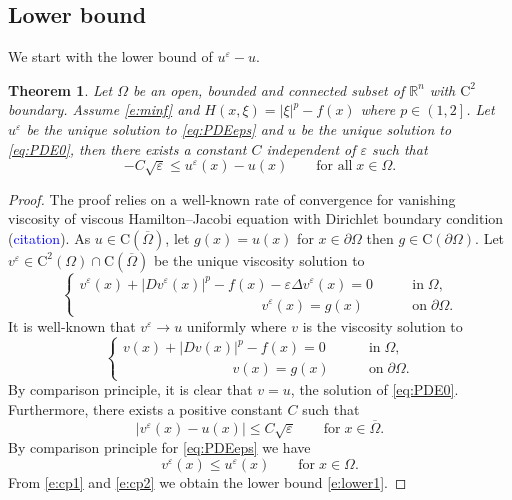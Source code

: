 \documentclass[11pt,reqno]{amsart}
\numberwithin{figure}{section}
\theoremstyle{plain}
\newtheorem{thm}{Theorem}[section]
\theoremstyle{remark}
\numberwithin{equation}{section}
\newcommand{\R}{\mathbb{R}}
\begin{document}
\subsection{Lower bound}
We start with the lower bound of $u^\varepsilon - u$.
\begin{thm} Let $\Omega$ be an open, bounded and connected subset of $\R^n$ with $\mathrm{C}^2$ boundary. Assume \eqref{e:minf} and $H(x,\xi) = |\xi|^p - f(x)$ where $p\in\left(1,2\right]$. Let $u^\varepsilon$ be the unique solution to \eqref{eq:PDEeps} and $u$ be the unique solution to \eqref{eq:PDE0}, then there exists a constant $C$ independent of $\varepsilon$ such that
\begin{equation}\label{e:lower1}
    -C\sqrt{\varepsilon} \leq u^\varepsilon(x) - u(x) \qquad\text{for all}\;x\in \Omega.
\end{equation} 
\end{thm}
\begin{proof} The proof relies on a well-known rate of convergence for vanishing viscosity of viscous Hamilton--Jacobi equation with Dirichlet boundary condition (\textcolor{blue}{citation}). As $u\in \mathrm{C}(\overline{\Omega})$, let $g(x) = u(x)$ for $x\in \partial\Omega$ then $g\in \mathrm{C}(\partial\Omega)$. Let $v^\varepsilon\in \mathrm{C}^2(\Omega)\cap \mathrm{C}(\overline{\Omega})$ be the unique viscosity solution to
\begin{equation*}
    \begin{cases}
          v^\varepsilon(x) + |Dv^\varepsilon(x)|^p - f(x) - \varepsilon \Delta v^\varepsilon(x) = 0 &\qquad\text{in}\;\Omega,\\
        \qquad\qquad\qquad\qquad\qquad \qquad\quad v^\varepsilon(x) = g(x) &\qquad\text{on}\;\partial\Omega.
    \end{cases}
\end{equation*}
It is well-known that $v^\varepsilon \to u$ uniformly where $v$ is the viscosity solution to
\begin{equation*}
\begin{cases}
       v(x) + |Dv(x)|^p - f(x) = 0 &\qquad\text{in}\;\Omega,\\
     \qquad\qquad\qquad\quad\;\;\; v(x) = g(x)&\qquad\text{on}\;\partial\Omega. 
\end{cases}
\end{equation*}
By comparison principle, it is clear that $v = u$, the solution of \eqref{eq:PDE0}. Furthermore, there exists a positive constant $C$ such that 
\begin{equation}\label{e:cp1}
     |v^\varepsilon(x)  - u(x)| \leq C\sqrt{\varepsilon} \qquad\text{for}\;x\in \overline{\Omega}.
\end{equation}
By comparison principle for \eqref{eq:PDEeps} we have
\begin{equation}\label{e:cp2}
    v^\varepsilon(x)\leq u^\varepsilon(x) \qquad\text{for}\;x\in \Omega.
\end{equation}
From \eqref{e:cp1} and \eqref{e:cp2} we obtain the lower bound \eqref{e:lower1}.
\end{proof}
\end{document}
